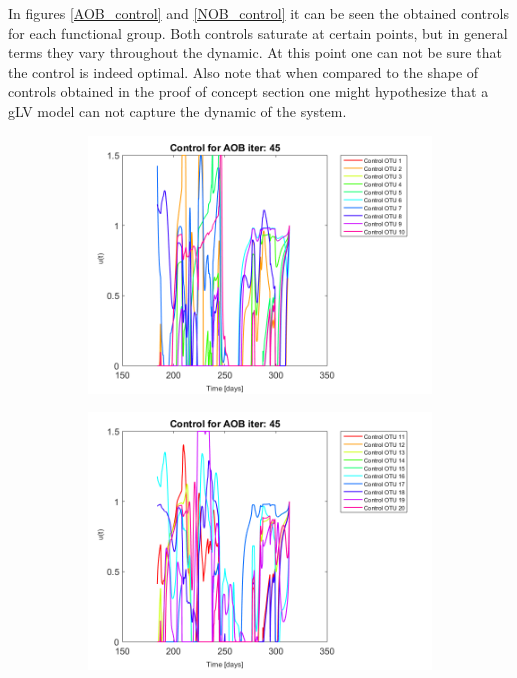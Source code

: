 \documentclass[3p,times]{elsarticle}
\begin{document}
In figures \ref{AOB_control} and \ref{NOB_control} it can be seen the obtained controls for each functional group. Both controls saturate at certain points, but in general terms they vary throughout the dynamic. At this point one can not be sure that the control is indeed optimal. Also note that when compared to the shape of controls obtained in the proof of concept section one might hypothesize that a gLV model can not capture the dynamic of the system.


\begin{figure}[h]
	\centering
	\begin{subfigure}{0.45 \textwidth}
		\includegraphics[width =\textwidth]{Application//191218_Reactor_A_Control_AOB_iter_45_plot_1}
	\end{subfigure}
	\begin{subfigure}{0.45 \textwidth}
		\includegraphics[width =\textwidth]{Application//191218_Reactor_A_Control_AOB_iter_45_plot_2}

\end{subfigure}
\end{figure}
\end{document}
